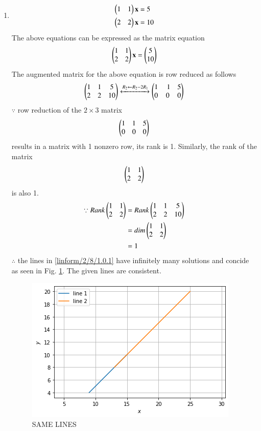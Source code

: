 \begin{enumerate}
\item
\begin{align}
\begin{split}
\begin{pmatrix}1 & 1 \end{pmatrix}\mathbf{x}&=5
\\
\begin{pmatrix}2 & 2 \end{pmatrix}\mathbf{x}&=10
\end{split}
\end{align}
The above equations can be expressed as the matrix equation
\begin{align}
\begin{pmatrix}1 & 1\\2 & 2\end{pmatrix} \mathbf{x} = \begin{pmatrix}5\\10\end{pmatrix}
\end{align}
%
The augmented matrix for the above equation is row reduced as follows
\begin{align}
\begin{pmatrix}1 & 1 & 5\\2 & 2 & 10\end{pmatrix} 
\xleftrightarrow {R_2\leftarrow R_2 -2R_1}\begin{pmatrix}1 & \ 1 & 5 \\0 & 0 & 0 \end{pmatrix}
\end{align}
%
$\because$ row reduction of the $2\times 3$ matrix
%
\begin{align}
\begin{pmatrix}1 & 1 & 5\\0 & 0 & 0\end{pmatrix} 
\end{align}
%
results in a matrix with 1 nonzero row, its rank is 1. 
%
Similarly, the rank of the matrix 
\begin{align}
\begin{pmatrix}1 & 1 \\2 & 2 \end{pmatrix} 
\end{align}
%
is also 1.
%
\begin{align}
\because Rank \begin{pmatrix}1 & 1\\2 & 2\end{pmatrix} &= Rank\begin{pmatrix}1 & 1 & 5\\2 & 2 & 10\end{pmatrix} \nonumber\\
 &=dim \begin{pmatrix}1 & 1\\2 & 2\end{pmatrix}\nonumber\\
 &=1
\end{align}
$\therefore$ the  lines in \eqref{linform/2/8/1.0.1} have infinitely many solutions and concide as seen in Fig. \ref{linform/2/8/fig:SAME LINES.}. The given lines are consistent.
%
\begin{figure}[ht!]
\centering
    \includegraphics[width=\columnwidth]{solutions/su2021/2/8/ASSIGNMENT2/consistent.png}
    \caption{SAME LINES}
    \label{linform/2/8/fig:SAME LINES.}
\end{figure} 


\end{enumerate}
